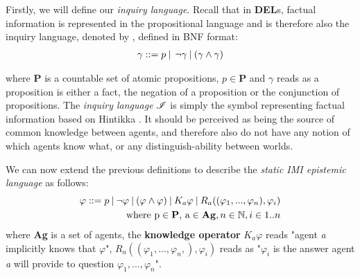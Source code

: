 Firstly, we will define our \textit{inquiry language}. Recall that in
\textbf{DEL}s, factual information is represented in the propositional language
and is therefore also the inquiry language, denoted by \oracle, defined in BNF
format:
\begin{align}
    \gamma::= p \:|\:\:\neg\gamma\:|\:(\gamma\land\gamma) \label{eq:1}
\end{align}

where \textbf{P} is a countable set of atomic propositions, $p \in\mathbf{P}$
and $\gamma$ reads as a proposition is either a fact, the negation of a
proposition or the conjunction of propositions. The \textit{inquiry language}
$\mathscr{I}$ is simply the symbol representing factual information based on
Hintikka \cite{hintikka88}. It should be perceived as being the source of
common knowledge between agents, and therefore also do not have any notion of
which agents know what, or any distinguish-ability between worlds.

We can now extend the previous definitions to describe the \textit{static IMI
    epistemic language} \staticlang\: as follows:
\begin{align}
    \begin{split}
        \varphi ::= p \:|\:\neg\varphi\:|\:(\varphi \land \varphi) \:|\: K_a\varphi \:|\: R_a((\varphi_1,...,\varphi_n), \varphi_i) \\ \text{where p} \in \text{\textbf{P}}\text{, a} \in \text{\textbf{Ag}}, n \in \mathbb{N}, i \in 1..n \label{eq:2}
    \end{split}
\end{align}
where \textbf{Ag} is a set of agents, the \textbf{knowledge operator} $K_a\varphi$ reads "agent \textit{a} implicitly knows that $\varphi$",  $R_a((\varphi_1,...,\varphi_n,), \varphi_i)$ reads as "$\varphi_i$ is the answer agent \textit{a} will provide to question $\varphi_1,...,\varphi_n$". \\

